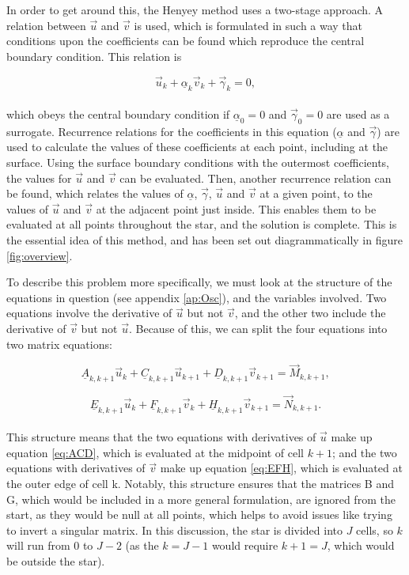 \documentclass[11pt]{amsart}
\begin{document}
In order to get around this, the Henyey method uses a two-stage approach.  A relation between $\vec{u}$ and $\vec{v}$ is used, which is formulated in such a way that conditions upon the coefficients can be found which reproduce the central boundary condition.  This relation is

\begin{equation} \label{eq:relation}
\vec{u}_{k}  + \underline{\alpha}_{k}  \vec{v}_{k}  + \vec{\gamma}_{k}  = 0,
\end{equation}
\\
which obeys the central boundary condition if $\underline{\alpha}_{0} = 0$ and $\vec{\gamma}_{0} = 0$ are used as a surrogate.  Recurrence relations for the coefficients in this equation ($\underline{\alpha}$ and $\vec{\gamma}$) are used to calculate the values of these coefficients at each point, including at the surface.  Using the surface boundary conditions with the outermost coefficients, the values for $\vec{u}$ and $\vec{v}$ can be evaluated.  Then, another recurrence relation can be found, which relates the values of $\underline{\alpha}$, $\vec{\gamma}$, $\vec{u}$ and $\vec{v}$ at a given point, to the values of $\vec{u}$ and $\vec{v}$ at the adjacent point just inside.  This enables them to be evaluated at all points throughout the star, and the solution is complete.  This is the essential idea of this method, and has been set out diagrammatically in figure \ref{fig:overview}.

To describe this problem more specifically, we must look at the structure of the equations in question (see appendix \ref{ap:Osc}), and the variables involved.  Two equations involve the derivative of $\vec{u}$ but not $\vec{v}$, and the other two include the derivative of $\vec{v}$ but not $\vec{u}$.  Because of this, we can split the four equations into two matrix equations:

\begin{equation} \label{eq:ACD}
\underline{A}_{k,k+1} \vec{u}_{k} + \underline{C}_{k,k+1} \vec{u}_{k+1} + \underline{D}_{k,k+1} \vec{v}_{k+1} = \vec{M}_{k,k+1},
\end{equation} 

\begin{equation} \label{eq:EFH}
\underline{E}_{k,k+1} \vec{u}_{k} + \underline{F}_{k,k+1} \vec{v}_{k} + \underline{H}_{k,k+1} \vec{v}_{k+1} = \vec{N}_{k,k+1}.
\end{equation} 
\\

This structure means that the two equations with derivatives of $\vec{u}$ make up equation \ref{eq:ACD}, which is evaluated at the midpoint of cell $k+1$; and the two equations with derivatives of $\vec{v}$ make up equation \ref{eq:EFH}, which is evaluated at the outer edge of cell k.  Notably, this structure ensures that the matrices B and G, which would be included in a more general formulation, are ignored from the start, as they would be null at all points, which helps to avoid issues like trying to invert a singular matrix.  In this discussion, the star is divided into $J$ cells, so $k$ will run from $0$ to $J-2$ (as the $k = J-1$ would require $k+1 = J$, which would be outside the star).
\end{document}
